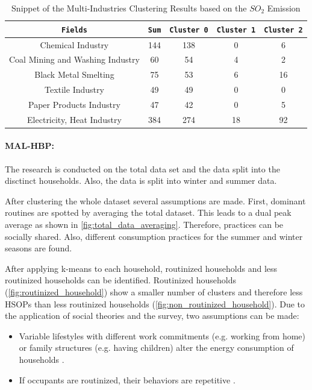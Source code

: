 \begin{table}[h]
    \centering
    \begin{tabular}{c|c|c|c|c}
        \texttt{Fields} & \texttt{Sum} & \texttt{Cluster 0} & \texttt{Cluster 1} & \texttt{Cluster 2} \\
        \hline
        Chemical Industry & 144 & 138 & 0 & 6 \\
        Coal Mining and Washing Industry & 60 & 54 & 4 & 2 \\
        Black Metal Smelting & 75 & 53 & 6 & 16 \\
        Textile Industry & 49 & 49 & 0 & 0 \\
        Paper Products Industry & 47 & 42 & 0 & 5 \\
        Electricity, Heat Industry & 384 & 274 & 18 & 92 \\
    \end{tabular}
    \caption{Snippet of the Multi-Industries Clustering Results based on the $SO_2$ Emission \cite{LIU-BDE}}
    \label{tab:multi_industries_clustering_results_based_on_the_so2_emission}
\end{table}

\paragraph*{MAL-HBP:}
The research is conducted on the total data set and the data split into the disctinct households.
Also, the data is split into winter and summer data.

After clustering the whole dataset several assumptions are made.
First, dominant routines are spotted by averaging the total dataset.
This leads to a dual peak average as shown in \autoref{fig:total_data_averaging}.
Therefore, practices can be socially shared.
Also, different consumption practices for the summer and winter seasons are found.

After applying k-means to each household, routinized households and less routinized households can be identified.
Routinized households (\autoref{fig:routinized_household}) show a smaller number of clusters and therefore less HSOPs than less routinized households (\autoref{fig:non_routinized_household}).
Due to the application of social theories and the survey, two assumptions can be made:
\begin{itemize}
    \item Variable lifestyles with different work commitments (e.g. working from home) or family structures (e.g. having children) alter the energy consumption of households \cite{KUR-HBP}.
    \item If occupants are routinized, their behaviors are repetitive \cite{BRE-EWP}.
\end{itemize}

